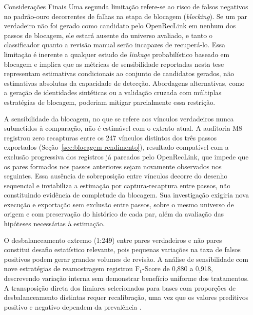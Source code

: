 \begin{chapter}{Considerações Finais}
Uma segunda limitação refere-se ao risco de falsos negativos no padrão-ouro decorrentes de falhas na etapa de blocagem (\textit{blocking}). Se um par verdadeiro não foi gerado como candidato pelo OpenRecLink em nenhum dos passos de blocagem, ele estará ausente do universo avaliado, e tanto o classificador quanto a revisão manual serão incapazes de recuperá-lo. Essa limitação é inerente a qualquer estudo de \textit{linkage} probabilístico baseado em blocagem \cite{Doidge2019linkageerror} e implica que as métricas de sensibilidade reportadas nesta tese representam estimativas condicionais ao conjunto de candidatos gerados, não estimativas absolutas da capacidade de detecção. Abordagens alternativas, como a geração de identidades sintéticas \cite{Lam2024synthetic} ou a validação cruzada com múltiplas estratégias de blocagem, poderiam mitigar parcialmente essa restrição.

A sensibilidade da blocagem, no que se refere aos vínculos verdadeiros nunca submetidos à comparação, não é estimável com o extrato atual. A auditoria M8 registrou zero recapturas entre os 247 vínculos distintos dos três passos exportados (Seção~\ref{sec:blocagem-rendimento}), resultado compatível com a exclusão progressiva dos registros já pareados pelo OpenRecLink, que impede que os pares formados nos passos anteriores sejam novamente observados nos seguintes. Essa ausência de sobreposição entre vínculos decorre do desenho sequencial e inviabiliza a estimação por captura-recaptura entre passos, não constituindo evidência de completude da blocagem. Sua investigação exigiria nova execução e exportação sem exclusão entre passos, sobre o mesmo universo de origem e com preservação do histórico de cada par, além da avaliação das hipóteses necessárias à estimação.

O desbalanceamento extremo (1:249) entre pares verdadeiros e não pares constitui desafio estatístico relevante, pois pequenas variações na taxa de falsos positivos podem gerar grandes volumes de revisão. A análise de sensibilidade com nove estratégias de reamostragem registrou F$_1$-Score de 0,880 a 0,918, descrevendo variação interna sem demonstrar benefício uniforme dos tratamentos. A transposição direta dos limiares selecionados para bases com proporções de desbalanceamento distintas requer recalibração, uma vez que os valores preditivos positivo e negativo dependem da prevalência \cite{Shaw2022biases}.


\end{chapter}
